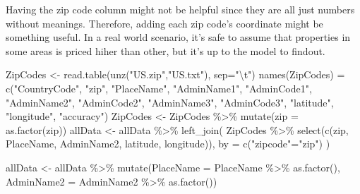 \documentclass[
]{article}
\newenvironment{Shaded}{\begin{snugshade}}{\end{snugshade}}
\newcommand{\AttributeTok}[1]{\textcolor[rgb]{0.77,0.63,0.00}{#1}}
\newcommand{\FunctionTok}[1]{\textcolor[rgb]{0.00,0.00,0.00}{#1}}
\newcommand{\NormalTok}[1]{#1}
\newcommand{\OtherTok}[1]{\textcolor[rgb]{0.56,0.35,0.01}{#1}}
\newcommand{\SpecialCharTok}[1]{\textcolor[rgb]{0.00,0.00,0.00}{#1}}
\newcommand{\StringTok}[1]{\textcolor[rgb]{0.31,0.60,0.02}{#1}}
\begin{document}
Having the zip code column might not be helpful since they are all just
numbers without meanings. Therefore, adding each zip code's coordinate
might be something useful. In a real world scenario, it's safe to assume
that properties in some areas is priced hiher than other, but it's up to
the model to findout.

\begin{Shaded}
\begin{Highlighting}[]
\NormalTok{ZipCodes }\OtherTok{\textless{}{-}} \FunctionTok{read.table}\NormalTok{(}\FunctionTok{unz}\NormalTok{(}\StringTok{"US.zip"}\NormalTok{,}\StringTok{"US.txt"}\NormalTok{), }\AttributeTok{sep=}\StringTok{"}\SpecialCharTok{\textbackslash{}t}\StringTok{"}\NormalTok{)}
\FunctionTok{names}\NormalTok{(ZipCodes) }\OtherTok{=} \FunctionTok{c}\NormalTok{(}\StringTok{"CountryCode"}\NormalTok{, }\StringTok{"zip"}\NormalTok{, }\StringTok{"PlaceName"}\NormalTok{, }
\StringTok{"AdminName1"}\NormalTok{, }\StringTok{"AdminCode1"}\NormalTok{, }\StringTok{"AdminName2"}\NormalTok{, }\StringTok{"AdminCode2"}\NormalTok{, }
\StringTok{"AdminName3"}\NormalTok{, }\StringTok{"AdminCode3"}\NormalTok{, }\StringTok{"latitude"}\NormalTok{, }\StringTok{"longitude"}\NormalTok{, }\StringTok{"accuracy"}\NormalTok{) }
\NormalTok{ZipCodes }\OtherTok{\textless{}{-}}\NormalTok{ ZipCodes }\SpecialCharTok{\%\textgreater{}\%} \FunctionTok{mutate}\NormalTok{(}\AttributeTok{zip =} \FunctionTok{as.factor}\NormalTok{(zip))}
\NormalTok{allData }\OtherTok{\textless{}{-}}\NormalTok{ allData }\SpecialCharTok{\%\textgreater{}\%} 
  \FunctionTok{left\_join}\NormalTok{(}
\NormalTok{    ZipCodes }\SpecialCharTok{\%\textgreater{}\%} 
      \FunctionTok{select}\NormalTok{(}\FunctionTok{c}\NormalTok{(zip, }
\NormalTok{               PlaceName, }
\NormalTok{               AdminName2, }
\NormalTok{               latitude, }
\NormalTok{               longitude)), }\AttributeTok{by =} \FunctionTok{c}\NormalTok{(}\StringTok{"zipcode"}\OtherTok{=}\StringTok{"zip"}\NormalTok{)}
\NormalTok{  )}

\NormalTok{allData }\OtherTok{\textless{}{-}}\NormalTok{ allData }\SpecialCharTok{\%\textgreater{}\%} \FunctionTok{mutate}\NormalTok{(}\AttributeTok{PlaceName =}\NormalTok{ PlaceName }\SpecialCharTok{\%\textgreater{}\%} \FunctionTok{as.factor}\NormalTok{(), }
                              \AttributeTok{AdminName2 =}\NormalTok{ AdminName2 }\SpecialCharTok{\%\textgreater{}\%} \FunctionTok{as.factor}\NormalTok{())}
\end{Highlighting}
\end{Shaded}
\end{document}
